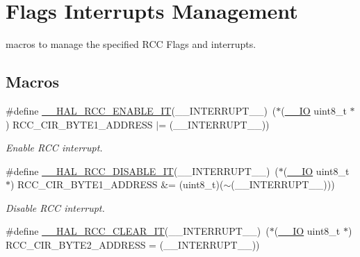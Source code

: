 \hypertarget{group___r_c_c___flags___interrupts___management}{}\section{Flags Interrupts Management}
\label{group___r_c_c___flags___interrupts___management}


macros to manage the specified R\+CC Flags and interrupts.  


\subsection*{Macros}
\begin{DoxyCompactItemize}
\item 
\#define \hyperlink{group___r_c_c___flags___interrupts___management_ga180fb20a37b31a6e4f7e59213a6c0405}{\+\_\+\+\_\+\+H\+A\+L\+\_\+\+R\+C\+C\+\_\+\+E\+N\+A\+B\+L\+E\+\_\+\+IT}(\+\_\+\+\_\+\+I\+N\+T\+E\+R\+R\+U\+P\+T\+\_\+\+\_\+)~($\ast$(\hyperlink{core__sc300_8h_aec43007d9998a0a0e01faede4133d6be}{\+\_\+\+\_\+\+IO} uint8\+\_\+t $\ast$) R\+C\+C\+\_\+\+C\+I\+R\+\_\+\+B\+Y\+T\+E1\+\_\+\+A\+D\+D\+R\+E\+SS $\vert$= (\+\_\+\+\_\+\+I\+N\+T\+E\+R\+R\+U\+P\+T\+\_\+\+\_\+))
\begin{DoxyCompactList}\small\item\em Enable R\+CC interrupt. \end{DoxyCompactList}\item 
\#define \hyperlink{group___r_c_c___flags___interrupts___management_gafc4df8cd4df0a529d11f18bf1f7e9f50}{\+\_\+\+\_\+\+H\+A\+L\+\_\+\+R\+C\+C\+\_\+\+D\+I\+S\+A\+B\+L\+E\+\_\+\+IT}(\+\_\+\+\_\+\+I\+N\+T\+E\+R\+R\+U\+P\+T\+\_\+\+\_\+)~($\ast$(\hyperlink{core__sc300_8h_aec43007d9998a0a0e01faede4133d6be}{\+\_\+\+\_\+\+IO} uint8\+\_\+t $\ast$) R\+C\+C\+\_\+\+C\+I\+R\+\_\+\+B\+Y\+T\+E1\+\_\+\+A\+D\+D\+R\+E\+SS \&= (uint8\+\_\+t)($\sim$(\+\_\+\+\_\+\+I\+N\+T\+E\+R\+R\+U\+P\+T\+\_\+\+\_\+)))
\begin{DoxyCompactList}\small\item\em Disable R\+CC interrupt. \end{DoxyCompactList}\item 
\#define \hyperlink{group___r_c_c___flags___interrupts___management_ga9d8ab157f58045b8daf8136bee54f139}{\+\_\+\+\_\+\+H\+A\+L\+\_\+\+R\+C\+C\+\_\+\+C\+L\+E\+A\+R\+\_\+\+IT}(\+\_\+\+\_\+\+I\+N\+T\+E\+R\+R\+U\+P\+T\+\_\+\+\_\+)~($\ast$(\hyperlink{core__sc300_8h_aec43007d9998a0a0e01faede4133d6be}{\+\_\+\+\_\+\+IO} uint8\+\_\+t $\ast$) R\+C\+C\+\_\+\+C\+I\+R\+\_\+\+B\+Y\+T\+E2\+\_\+\+A\+D\+D\+R\+E\+SS = (\+\_\+\+\_\+\+I\+N\+T\+E\+R\+R\+U\+P\+T\+\_\+\+\_\+))

\end{DoxyCompactItemize}
